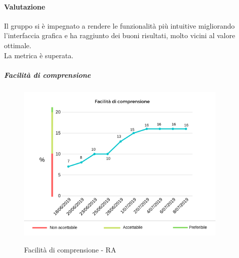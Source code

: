 	\paragraph*{Valutazione} Il gruppo si è  impegnato a rendere le funzionalità più  intuitive migliorando l'interfaccia grafica e ha raggiunto dei buoni risultati, molto vicini al valore ottimale.
	\\ La metrica è superata.
	\pagebreak
	\subparagraph{Facilità di comprensione}
	\begin{center}
		\begin{figure}[h] 
			\centering 
			\includegraphics[width=0.90\textwidth]{res/images/new/facilitaComprensione.png}\\
			\caption{Facilità di comprensione - RA}
		\end{figure}
	\end{center}
